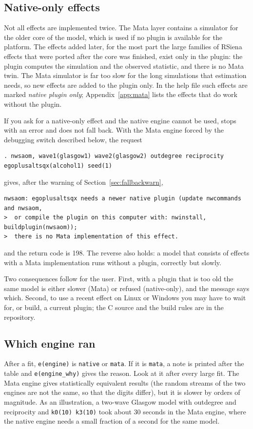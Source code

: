 \subsection{Native-only effects}

Not all effects are implemented twice. The Mata layer contains a simulator for the older core of the model, which is used if no plugin is available for the platform. The effects added later, for the most part the large families of RSiena effects that were ported after the core was finished, exist only in the plugin: the plugin computes the simulation and the observed statistic, and there is no Mata twin. The Mata simulator is far too slow for the long simulations that estimation needs, so new effects are added to the plugin only. In the help file such effects are marked \emph{native plugin only}; Appendix~\ref{app:mata} lists the effects that do work without the plugin.

If you ask for a native-only effect and the native engine cannot be used, \nwsaom{} stops with an error and does not fall back. With the Mata engine forced by the debugging switch described below, the request
\begin{lstlisting}
. nwsaom, wave1(glasgow1) wave2(glasgow2) outdegree reciprocity egoplusaltsqx(alcohol1) seed(1)
\end{lstlisting}
gives, after the warning of Section~\ref{sec:fallbackwarn},
\begin{lstlisting}
nwsaom: egoplusaltsqx needs a newer native plugin (update nwcommands and nwsaom,
>  or compile the plugin on this computer with: nwinstall, buildplugin(nwsaom));
>  there is no Mata implementation of this effect.
\end{lstlisting}
and the return code is 198. The reverse also holds: a model that consists of effects with a Mata implementation runs without a plugin, correctly but slowly.

Two consequences follow for the user. First, with a plugin that is too old the same model is either slower (Mata) or refused (native-only), and the message says which. Second, to use a recent effect on Linux or Windows you may have to wait for, or build, a current plugin; the C source and the build rules are in the repository.

\subsection{Which engine ran}

After a fit, \texttt{e(engine)} is \texttt{native} or \texttt{mata}. If it is \texttt{mata}, a note is printed after the table and \texttt{e(engine\_why)} gives the reason. Look at it after every large fit. The Mata engine gives statistically equivalent results (the random streams of the two engines are not the same, so that the digits differ), but it is slower by orders of magnitude. As an illustration, a two-wave Glasgow model with outdegree and reciprocity and \texttt{k0(10) k3(10)} took about 30 seconds in the Mata engine, where the native engine needs a small fraction of a second for the same model.

